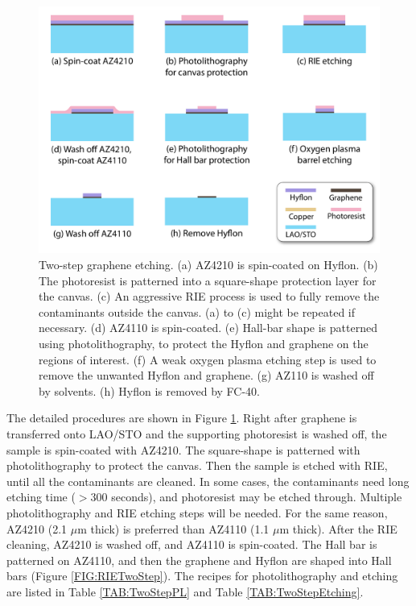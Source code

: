 \documentclass[pdflatex, sectionletters, 12pt]{pittetd}    %
\begin{document}
\begin{figure}[p]
	\centering
	\includegraphics[width=.8\textwidth]{Drawing/TwoStepEtching.pdf}
	\caption{Two-step graphene etching. (a) AZ4210 is spin-coated on Hyflon. (b) The photoresist is patterned into a square-shape protection layer for the canvas. (c) An aggressive RIE process is used to fully remove the contaminants outside the canvas. (a) to (c) might be repeated if necessary. (d) AZ4110 is spin-coated. (e) Hall-bar shape is patterned using photolithography, to protect the Hyflon and graphene on the regions of interest. (f) A weak oxygen plasma etching step is used to remove the unwanted Hyflon and graphene. (g) AZ110 is washed off by solvents. (h) Hyflon is removed by FC-40.}
	\label{FIG:TwoStepEtching}
\end{figure}

The detailed procedures are shown in Figure \ref{FIG:TwoStepEtching}. Right after graphene is transferred onto LAO/STO and the supporting photoresist is washed off, the sample is spin-coated with AZ4210. The square-shape is patterned with photolithography to protect the canvas. Then the sample is etched with RIE, until all the contaminants are cleaned. In some cases, the contaminants need long etching time ($> 300$ seconds), and photoresist may be etched through. Multiple photolithography and RIE etching steps will be needed.
For the same reason, AZ4210 (2.1 $\mu$m thick) is preferred than AZ4110 (1.1 $\mu$m thick). After the RIE cleaning, AZ4210 is washed off, and AZ4110 is spin-coated. The Hall bar is patterned on AZ4110, and then the graphene and Hyflon are shaped into Hall bars (Figure \ref{FIG:RIETwoStep}). The recipes for photolithography and etching are listed in Table \ref{TAB:TwoStepPL} and Table \ref{TAB:TwoStepEtching}.
\end{document}
